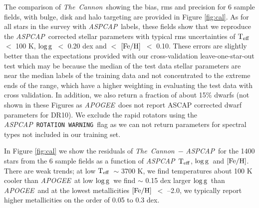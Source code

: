 \documentclass[12pt, preprint]{aastex}
\newcommand{\teff}{\mbox{$\rm T_{eff}$}}
\newcommand{\feh}{\mbox{$\rm [Fe/H]$}}
\newcommand{\logg}{\mbox{$\rm \log g$}}
\newcommand{\tc}{\textsl{The~Cannon}}
\newcommand{\apogee}{\textsl{APOGEE}}
\newcommand{\aspcap}{\textsl{ASPCAP}}
\newcommand{\rotwarn}{\texttt{ROTATION WARNING}}
\begin{document}
The comparison of \tc\, showing the bias, rms and precision for 6 sample fields, with bulge, disk and halo targeting are provided in Figure \ref{fig:cal}. As for all stars in the survey with \aspcap\ labels, these fields show that we reproduce the \aspcap\ corrected stellar parameters with typical rms uncertainties of \teff\ $<$ 100 K, \logg\ $<$ 0.20 dex and $<$ \feh\ $<$ 0.10. These errors are slightly better than the expectations provided with our cross-validation leave-one-star-out test which may be because the median of the test data stellar parameters are near the median labels of the training data and not concentrated to the extreme ends of the range, which have a higher weighting in evaluating the test data with cross validation. In addition, we also return a fraction of about 15\% dwarfs (not shown in these Figures as \apogee\ does not report ASCAP corrected dwarf parameters for DR10). We exclude the rapid rotators using the \aspcap\ \rotwarn\ flag as we can not return parameters for spectral types not included in our training set. 

In Figure \ref{fig:cal} we show the residuals of \tc\ $-$ \aspcap\ for the 1400 stars from the 6 sample fields as a function of \aspcap\ \teff, \logg\ and \feh. There are weak trends; at low \teff\ $\sim$ 3700 K, we find temperatures about 100 K cooler than \apogee\, at low \logg\ we find $\sim$ 0.15 dex larger \logg\ than \apogee\ and at the lowest metallicities \feh\ $<$ --2.0, we typically report higher metallicities on the order of 0.05 to 0.3 dex. 
\end{document}
